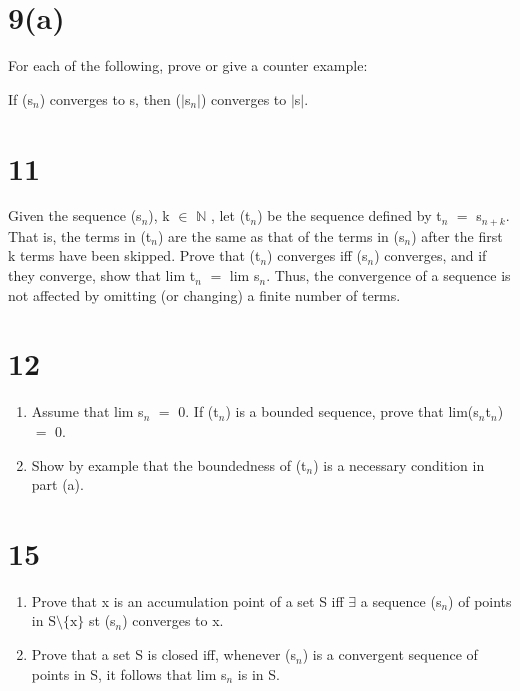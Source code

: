 \documentclass{article}
\newcommand{\mt}[1]{\ensuremath{#1}}
\newcommand\bsc[2][\DefaultOpt]{%
  \def\DefaultOpt{#2}%
  \section[#1]{#2}%
}
\newcommand{\balist}{\begin{enumerate}[label=\alph*.]}
\newcommand{\elist}{\end{enumerate}}
\newcommand{\bn}{\mt{\mathbb{N}} }       %
\newcommand{\mem}{\mt{\in} }
\newcommand{\exs}{\mt{\exists} }
\newcommand{\av}[1]{\mt{|}#1\mt{|}}  %
\newcommand{\prn}[1]{(#1)}
\newcommand{\bk}[1]{\{#1\}}
\newcommand{\eql}{\mt{=} }
\newcommand{\uw}[2]{#1\mt{_{#2}}}
\newcommand{\bnt}[2]{\mt{\textrm{#1}\setminus{\textrm{#2}}}}
\begin{document}
\bsc{9(a)}{
For each of the following, prove or give a counter example:

If (\uw{s}{n}) converges to s, then \prn{\av{\uw{s}{n}}} converges to \av{s}.

}

\bsc{11}{
Given the sequence \prn{\uw{s}{n}}, k \mem \bn, let \prn{\uw{t}{n}} be the sequence defined by \uw{t}{n} \eql \uw{s}{n + k}. That is, the terms in (\uw{t}{n}) are the same as that of the terms in (\uw{s}{n}) after the first k terms have been skipped. Prove that \prn{\uw{t}{n}} converges iff \prn{\uw{s}{n}} converges, and if they converge, show that lim \uw{t}{n} \eql lim \uw{s}{n}. Thus, the convergence of a sequence is not affected by omitting (or changing) a finite number of terms.

}

\bsc{12}{

\balist
\item Assume that lim \uw{s}{n} \eql 0. If \prn{\uw{t}{n}} is a bounded sequence, prove that lim(\uw{s}{n}\uw{t}{n}) \eql 0.
\item Show by example that the boundedness of \prn{\uw{t}{n}} is a necessary condition in part (a).
\elist

}

\bsc{15}{

\balist
\item Prove that x is an accumulation point of a set S iff \exs a sequence \prn{\uw{s}{n}} of points in \bnt{S}{\bk{x}} st \prn{\uw{s}{n}} converges to x.
\item Prove that a set S is closed iff, whenever \prn{\uw{s}{n}} is a convergent sequence of points in S, it follows that lim \uw{s}{n} is in S.
\elist

}
\end{document}
